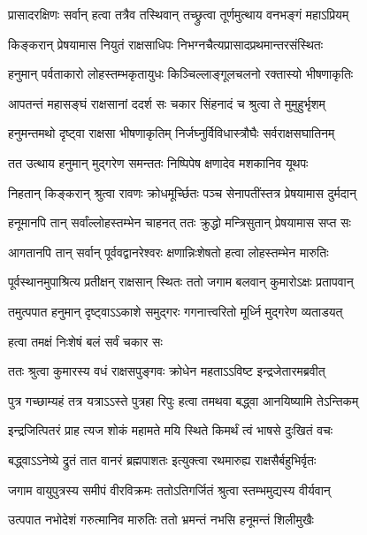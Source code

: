 \twolineshloka
{प्रासादरक्षिणः सर्वान् हत्वा तत्रैव तस्थिवान्}
{तच्छ्रुत्वा तूर्णमुत्थाय वनभङ्गं महाऽप्रियम्} %

\twolineshloka
{किङ्करान् प्रेषयामास नियुतं राक्षसाधिपः}
{निभग्नचैत्यप्रासादप्रथमान्तरसंस्थितः} %

\twolineshloka
{हनुमान् पर्वताकारो लोहस्तम्भकृतायुधः}
{किञ्चिल्लाङ्गूलचलनो रक्तास्यो भीषणाकृतिः} %

\twolineshloka
{आपतन्तं महासङ्घं राक्षसानां ददर्श सः}
{चकार सिंहनादं च श्रुत्वा ते मुमुहुर्भृशम्} %

\twolineshloka
{हनुमन्तमथो दृष्ट्वा राक्षसा भीषणाकृतिम्}
{निर्जघ्नुर्विविधास्त्रौघैः सर्वराक्षसघातिनम्} %

\twolineshloka
{तत उत्थाय हनुमान् मुद्गरेण समन्ततः}
{निष्पिपेष क्षणादेव मशकानिव यूथपः} %

\twolineshloka
{निहतान् किङ्करान् श्रुत्वा रावणः क्रोधमूर्च्छितः}
{पञ्च सेनापतींस्तत्र प्रेषयामास दुर्मदान्} %

\twolineshloka
{हनूमानपि तान् सर्वांल्लोहस्तम्भेन चाहनत्}
{ततः क्रुद्धो मन्त्रिसुतान् प्रेषयामास सप्त सः} %

\twolineshloka
{आगतानपि तान् सर्वान् पूर्ववद्वानरेश्वरः}
{क्षणान्निःशेषतो हत्वा लोहस्तम्भेन मारुतिः} %

\twolineshloka
{पूर्वस्थानमुपाश्रित्य प्रतीक्षन् राक्षसान् स्थितः}
{ततो जगाम बलवान् कुमारोऽक्षः प्रतापवान्} %

\twolineshloka
{तमुत्पपात हनुमान् दृष्ट्वाऽऽकाशे समुद्गरः}
{गगनात्त्वरितो मूर्ध्नि मुद्गरेण व्यताडयत्} %

\onelineshloka
{हत्वा तमक्षं निःशेषं बलं सर्वं चकार सः} %

\twolineshloka
{ततः श्रुत्वा कुमारस्य वधं राक्षसपुङ्गवः}
{क्रोधेन महताऽऽविष्ट इन्द्रजेतारमब्रवीत्} %

\twolineshloka
{पुत्र गच्छाम्यहं तत्र यत्राऽऽस्ते पुत्रहा रिपुः}
{हत्वा तमथवा बद्ध्वा आनयिष्यामि तेऽन्तिकम्} %

\twolineshloka
{इन्द्रजित्पितरं प्राह त्यज शोकं महामते}
{मयि स्थिते किमर्थं त्वं भाषसे दुःखितं वचः} %

\twolineshloka
{बद्ध्वाऽऽनेष्ये द्रुतं तात वानरं ब्रह्मपाशतः}
{इत्युक्त्वा रथमारुह्य राक्षसैर्बहुभिर्वृतः} %

\twolineshloka
{जगाम वायुपुत्रस्य समीपं वीरविक्रमः}
{ततोऽतिगर्जितं श्रुत्वा स्तम्भमुद्यस्य वीर्यवान्} %

\twolineshloka
{उत्पपात नभोदेशं गरुत्मानिव मारुतिः}
{ततो भ्रमन्तं नभसि हनूमन्तं शिलीमुखैः} %

